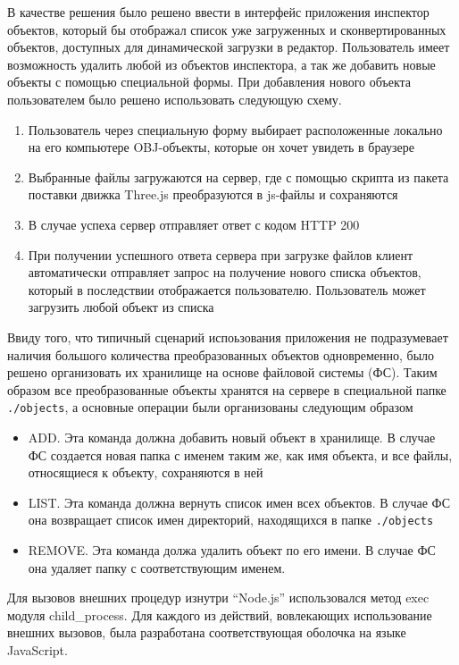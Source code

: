\documentclass[12pt, a4paper]{article}
\begin{document}
В качестве решения было решено ввести в интерфейс приложения инспектор объектов,
который бы отображал список уже загруженных и сконвертированных объектов,
доступных для динамической загрузки в редактор. Пользователь имеет возможность
удалить любой из объектов инспектора, а так же добавить новые объекты с помощью
специальной формы. При добавления нового объекта пользователем было решено
использовать следующую схему.
\begin{enumerate}
    \item Пользователь через специальную форму выбирает расположенные локально
    на его компьютере OBJ-объекты, которые он хочет увидеть в браузере
    \item Выбранные файлы загружаются на сервер, где с помощью скрипта из
    пакета поставки движка Three.js преобразуются в js-файлы и сохраняются
    \item В случае успеха сервер отправляет ответ с кодом HTTP 200
    \item При получении успешного ответа сервера при загрузке файлов клиент
    автоматически отправляет запрос на получение нового списка объектов, который
    в последствии отображается пользователю. Пользователь может загрузить любой
    объект из списка
\end{enumerate}

Ввиду того, что типичный сценарий испоьзования приложения не подразумевает
наличия большого количества преобразованных объектов одновременно, было решено
организовать их хранилище на основе файловой системы (ФС). Таким образом все
преобразованные объекты хранятся на сервере в специальной папке
\texttt{./objects}, а основные операции были организованы следующим
образом
\begin{itemize}
    \item ADD. Эта команда должна добавить новый объект в хранилище. В
    случае ФС создается новая папка с именем таким же, как имя объекта, и все
    файлы, относящиеся к объекту, сохраняются в ней
    \item LIST. Эта команда должна вернуть список имен всех объектов. В
    случае ФС она возвращает список имен директорий, находящихся в папке
    \texttt{./objects}
    \item REMOVE. Эта команда должа удалить объект по его имени. В случае
    ФС она удаляет папку с соответствующим именем.
\end{itemize}

Для вызовов внешних процедур изнутри ``Node.js'' использовался метод exec модуля
child\_process. Для каждого из действий, вовлекающих использование внешних
вызовов, была разработана соответствующая оболочка на языке JavaScript.
\end{document}
